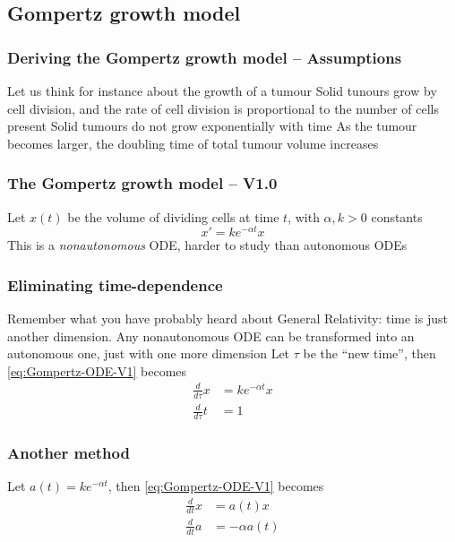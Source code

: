 \documentclass[aspectratio=169]{beamer}
\begin{document}
\subsection{Gompertz growth model}


\begin{frame}\frametitle{Deriving the Gompertz growth model -- Assumptions}
Let us think for instance about the growth of a tumour
\vfill
Solid tunours grow by cell division, and the rate of cell division is proportional to the number of cells present
\vfill
Solid tumours do not grow exponentially with time
\vfill
As the tumour becomes larger, the doubling time of total tumour volume increases
\end{frame}

\begin{frame}\frametitle{The Gompertz growth model -- V1.0}
Let $x(t)$ be the volume of dividing cells at time $t$, with $\alpha,k>0$ constants
\vfill
\begin{equation}\label{eq:Gompertz-ODE-V1}
x' = k e^{-\alpha t}x
\end{equation}
\vfill
This is a \emph{nonautonomous} ODE, harder to study than autonomous ODEs
\end{frame}

\begin{frame}\frametitle{Eliminating time-dependence}
Remember what you have probably heard about General Relativity: time is just another dimension. Any nonautonomous ODE can be transformed into an autonomous one, just with one more dimension
\vfill
Let $\tau$ be the ``new time'', then \eqref{eq:Gompertz-ODE-V1} becomes
\begin{align*}
\frac{d}{d\tau}x &= ke^{-\alpha t}x\\
\frac{d}{d\tau}t &= 1
\end{align*}
\end{frame}


\begin{frame}\frametitle{Another method}
Let $a(t)=k e^{-\alpha t}$, then \eqref{eq:Gompertz-ODE-V1} becomes
\begin{subequations}
\begin{align}
\frac{d}{dt}x &= a(t)x \label{sys:Gompertz-ODE-V1-transformed-dx} \\
\frac{d}{dt}a &= -\alpha a(t) \label{sys:Gompertz-ODE-V1-transformed-da}
\end{align}
\end{subequations}
\end{frame}
\end{document}
